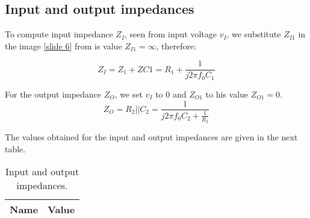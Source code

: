  \subsection{Input and output impedances}
 \par To compute input impedance $Z_I$, seen from input voltage $v_I$, we substitute $Z_{I1}$ in the image \ref{slide 6} from is value $Z_{I1}=\infty$, therefore:
 
 \begin{equation}
 Z_I=Z_1+Z{C1}=R_1+\frac{1}{j2\pi f_0C_1}
 \end{equation}
\par For the output impedance $Z_{O}$, we set $v_I$ to $0$ and $Z_{O1}$ to his value $Z_{O1}=0$.
\begin{equation}
Z_O=R_2||C_2=\frac{1}{j2\pi f_0C_2+\frac{1}{R_2}}
\end{equation}

\par The values obtained for the input and output impedances are given in the next table.

\begin{table}[H]
    \centering
    \begin{tabular}{|l|r|}
    \hline    
    {\bf Name} & {\bf Value} \\ \hline
    
    \end{tabular}
     \caption{Input and output impedances.}
    \label{tab:freq}
  \end{table}



  
 


 
 
